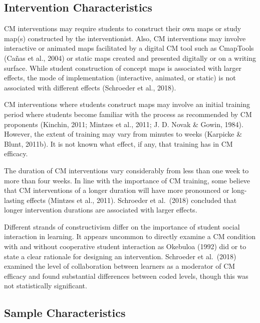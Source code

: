 \documentclass[
  letterpaper,
  DIV=11,
  numbers=noendperiod]{scrartcl}
\begin{document}
\hypertarget{intervention-characteristics}{%
\subsection{Intervention
Characteristics}\label{intervention-characteristics}}

CM interventions may require students to construct their own maps or
study map(s) constructed by the interventionist. Also, CM interventions
may involve interactive or animated maps facilitated by a digital CM
tool such as CmapTools (Cañas et al., 2004) or static maps created and
presented digitally or on a writing surface. While student construction
of concept maps is associated with larger effects, the mode of
implementation (interactive, animated, or static) is not associated with
different effects (Schroeder et al., 2018).

CM interventions where students construct maps may involve an initial
training period where students become familiar with the process as
recommended by CM proponents (Kinchin, 2011; Mintzes et al., 2011; J. D.
Novak \& Gowin, 1984). However, the extent of training may vary from
minutes to weeks (Karpicke \& Blunt, 2011b). It is not known what
effect, if any, that training has in CM efficacy.

The duration of CM interventions vary considerably from less than one
week to more than four weeks. In line with the importance of CM
training, some believe that CM interventions of a longer duration will
have more pronounced or long-lasting effects (Mintzes et al., 2011).
Schroeder et al.~(2018) concluded that longer intervention durations are
associated with larger effects.

Different strands of constructivism differ on the importance of student
social interaction in learning. It appears uncommon to directly examine
a CM condition with and without cooperative student interaction as
Okebuloa (1992) did or to state a clear rationale for designing an
intervention. Schroeder et al.~(2018) examined the level of
collaboration between learners as a moderator of CM efficacy and found
substantial differences between coded levels, though this was not
statistically significant.

\hypertarget{sample-characteristics}{%
\subsection{Sample Characteristics}\label{sample-characteristics}}
\end{document}

